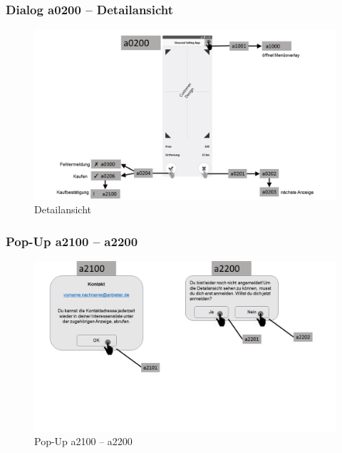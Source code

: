 \documentclass[a4paper,12pt,oneside]{scrartcl}
\begin{document}
\subsubsection{Dialog a0200 – Detailansicht}
\begin{figure}[!htbp]
\centering
\noindent\includegraphics[width=\linewidth,height=\textheight,keepaspectratio]{Dialoge/a0200}
\caption{Detailansicht}
\end{figure}
\FloatBarrier

\subsubsection{Pop-Up a2100 – a2200}
\begin{figure}[!htbp]
\centering
\noindent\includegraphics[width=\linewidth,height=\textheight,keepaspectratio]{Dialoge/a0200p}
\caption{Pop-Up a2100 – a2200}
\end{figure}
\FloatBarrier
\end{document}
